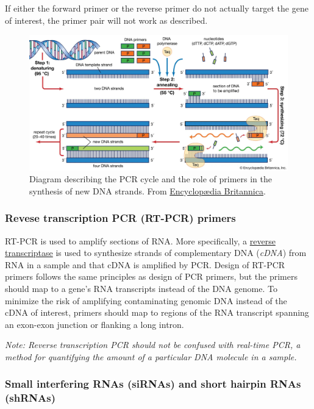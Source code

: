 \documentclass[letterpaper, 12pt]{article}
\begin{document}
If either the forward primer or the reverse primer do not actually target the gene of interest, the primer pair will not work as described.

\begin{figure}[h!tbp]
    \centering
    \includegraphics[width=\textwidth]{img/nucleotide_sequences/process-polymerase-chain-reaction.jpg}
    \caption*{Diagram describing the PCR cycle and the role of primers in the synthesis of new DNA strands. From \href{https://www.britannica.com/science/polymerase-chain-reaction}{Encyclop\ae dia Britannica}.}
\end{figure}

\subsubsection*{Revese transcription PCR (RT-PCR) primers}

RT-PCR is used to amplify sections of RNA. More specifically, a \href{https://en.wikipedia.org/wiki/Reverse_transcriptase}{reverse transcriptase} is used to synthesize strands of complementary DNA (\emph{cDNA}) from RNA in a sample and that cDNA is amplified by PCR. Design of RT-PCR primers follows the same principles as design of PCR primers, but the primers should map to a gene's RNA transcripts instead of the DNA genome. To minimize the risk of amplifying contaminating genomic DNA instead of the cDNA of interest, primers should map to regions of the RNA transcript spanning an exon-exon junction or flanking a long intron.

\textit{Note: Reverse transcription PCR should not be confused with real-time PCR, a method for quantifying the amount of a particular DNA molecule in a sample.}

\subsubsection*{Small interfering RNAs (siRNAs) and short hairpin RNAs (shRNAs)}
\end{document}
